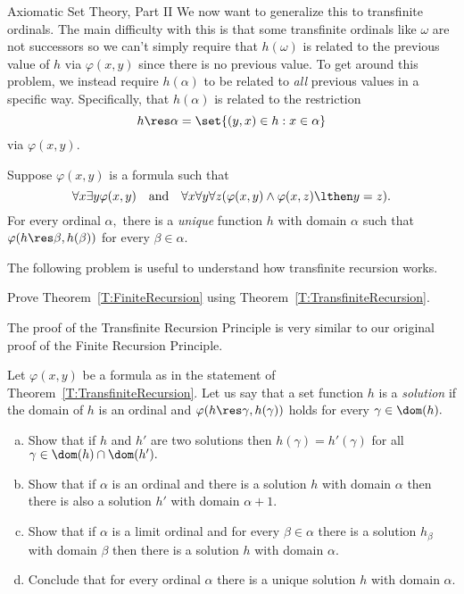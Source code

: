\begin{unit}{Axiomatic Set Theory, Part II}
\noindent
We now want to generalize this to transfinite ordinals.
The main difficulty with this is that some transfinite ordinals like \(\omega\) are not successors so we can't simply require that \(h(\omega)\) is related to the previous value of \(h\) via \(\varphi(x,y)\) since there is no previous value.
To get around this problem, we instead require \(h(\alpha)\) to be related to \emph{all} previous values in a specific way.
Specifically, that \(h(\alpha)\) is related to the restriction \[h \res \alpha = \set{(y,x) \in h :  x \in \alpha}\] via \(\varphi(x,y).\)

\begin{theorem}\label{T:TransfiniteRecursion}
  Suppose \(\varphi(x,y)\) is a formula such that \[\forall x \exists y \varphi(x,y) \quad\text{and}\quad \forall x \forall y \forall z(\varphi(x,y) \land \varphi(x,z) \lthen y = z).\]
  For every ordinal \(\alpha,\) there is a \emph{unique} function \(h\) with domain \(\alpha\) such that \(\varphi(h \res \beta,h(\beta))\) for every \(\beta \in \alpha.\) 
\end{theorem}

\noindent
The following problem is useful to understand how transfinite recursion works.

\begin{problem}
  Prove Theorem~\ref{T:FiniteRecursion} using Theorem~\ref{T:TransfiniteRecursion}.
\end{problem}

The proof of the Transfinite Recursion Principle is very similar to our original proof of the Finite Recursion Principle.

\begin{problem}\label{X:TransfiniteRecursion}
  Let \(\varphi(x,y)\) be a formula as in the statement of Theorem~\ref{T:TransfiniteRecursion}.
  Let us say that a set function \(h\) is a \emph{solution} if the domain of \(h\) is an ordinal and \(\varphi(h \res \gamma,h(\gamma))\) holds for every \(\gamma \in \dom(h).\)
  \begin{enumerate}[(a)]
  \item Show that if \(h\) and \(h'\) are two solutions then \(h(\gamma) = h'(\gamma)\) for all \(\gamma \in \dom(h) \cap \dom(h').\)
  \item Show that if \(\alpha\) is an ordinal and there is a solution \(h\) with domain \(\alpha\) then there is also a solution \(h'\) with domain \(\alpha+1.\)
  \item Show that if \(\alpha\) is a limit ordinal and for every \(\beta \in \alpha\) there is a solution \(h_\beta\) with domain \(\beta\) then there is a solution \(h\) with domain \(\alpha.\)
  \item Conclude that for every ordinal \(\alpha\) there is a unique solution \(h\) with domain \(\alpha.\)
  \end{enumerate}
\end{problem}


\end{unit}
